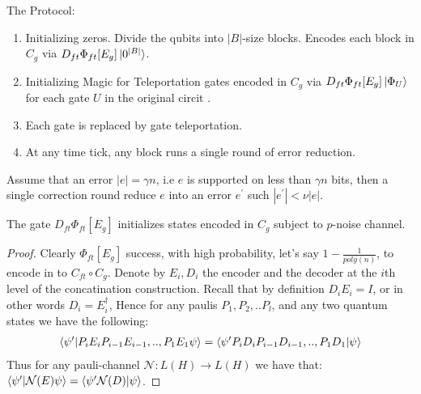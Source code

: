 \documentclass[manuscript,screen,review]{acmart}
\begin{document}
The Protocol:
\begin{enumerate}
  \item Initializing zeros. Divide the qubits into $|B|$-size blocks. Encodes each block in $C_{g}$ via $D_{ft} \Phi_{ft}[E_{g}] \ket{0^{|B|}}$.
  \item Initializing Magic for Teleportation gates encoded in $C_{g}$ via $D_{ft} \Phi_{ft}[E_{g}] \ket{\Phi_{U}}$ for each gate $U$ in the original circit .
  \item Each gate is replaced by gate teleportation.  
  \item At any time tick, any block runs a single round of error reduction.  
\end{enumerate}


\begin{claim}
  \label{claim:error} 
  Assume that an error $|e| = \gamma n $, i.e $e$ is supported on less than $\gamma n$ bits, then a single correction round reduce $e$ into an error $e^\prime$ such $|e^{\prime}| < \nu |e|$. 
\end{claim}


\begin{claim}
  The gate $ D_{ft} \Phi_{ft}[E_{g}]$ initializes states encoded in $C_{g}$ subject to $p$-noise channel.  
\end{claim}
\begin{proof}
  Clearly $\Phi_{ft}[E_{g}]$ success, with high probability, let's say $1 - \frac{1}{poly(n)}$, to encode in to $ C_{ft} \circ C_{g}$. Denote by $E_{i}, D_{i}$ the encoder and the decoder at the $i$th level of the concatination construction. Recall that by definition $D_{i}E_{i} = I$, or in other words $D_{i}= E_{i}^{\dagger}$, Hence for any paulis  $P_{1},P_{2},..P_{l}$, and any two quantum states we have the following:  
  \begin{equation*}
    \begin{split}
      \braket{ \psi^{\prime} | P_{i}E_{i}P_{i-1}E_{i-1},..,P_{1}E_{1} \psi } = \braket{ \psi^{\prime} P_{i}D_{i}P_{i-1}D_{i-1},..,P_{1}D_{1} | \psi }
    \end{split}
  \end{equation*}
  Thus for any pauli-channel $\mathcal{N} : L(H) \rightarrow L(H)$ we have that: $ \braket{ \psi^{\prime} | \mathcal{N}(E) \psi } = \braket{ \psi^{\prime} \mathcal{N}(D) | \psi }$. 
    
\end{proof}
\end{document}

